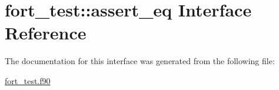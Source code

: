 \hypertarget{interfacefort__test_1_1assert__eq}{}\section{fort\+\_\+test\+:\+:assert\+\_\+eq Interface Reference}
\label{interfacefort__test_1_1assert__eq}


The documentation for this interface was generated from the following file\+:\begin{DoxyCompactItemize}
\item 
\hyperlink{fort__test_8f90}{fort\+\_\+test.\+f90}\end{DoxyCompactItemize}
